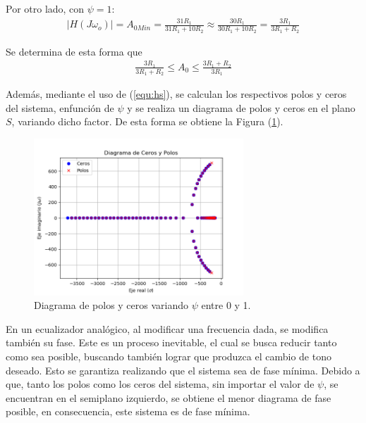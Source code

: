 Por otro lado, con $\psi = 1$:
\begin{equation*}
\begin{split}
|H\left(J\omega_o\right)| = A_{0Min} = \frac{31 R_{1}}{31 R_{1} + 10 R_{2}} \approx \frac{30 R_{1}}{30 R_{1} + 10 R_{2}} = \frac{3 R_{1}}{3 R_{1} + R_{2}}
\end{split}
\end{equation*}

Se determina de esta forma que
\begin{equation*}
\begin{split}
\frac{3 R_{1}}{3 R_{1} + R_{2}} \leq A_0 \leq \frac{3 R_{1} + R_{2}}{3 R_{1}}
\end{split}
\end{equation*}

Además, mediante el uso de (\ref{equ:hs}), se calculan los respectivos polos y ceros del sistema, enfunción de $\psi$ y se realiza un diagrama de polos y ceros en el plano $S$, variando dicho factor. De esta forma se obtiene la Figura (\ref{fig:zplanepsi}).

\begin{figure}[H]
	\centering
	\includegraphics[width=0.7\textwidth]{Imagenes/Zplanepsi.png}
\caption{Diagrama de polos y ceros variando $\psi$ entre 0 y 1.}
	\label{fig:zplanepsi}
\end{figure}

En un ecualizador analógico, al modificar una frecuencia dada, se modifica también su fase. Este es un proceso inevitable, el cual se busca reducir tanto como sea posible, buscando también lograr que produzca el cambio de tono deseado. Esto se garantiza realizando que el sistema sea de fase mínima.
Debido a que, tanto los polos como los ceros del sistema, sin importar el valor de $\psi$, se encuentran en el semiplano izquierdo, se obtiene el menor diagrama de fase posible, en consecuencia, este sistema es de fase mínima.

